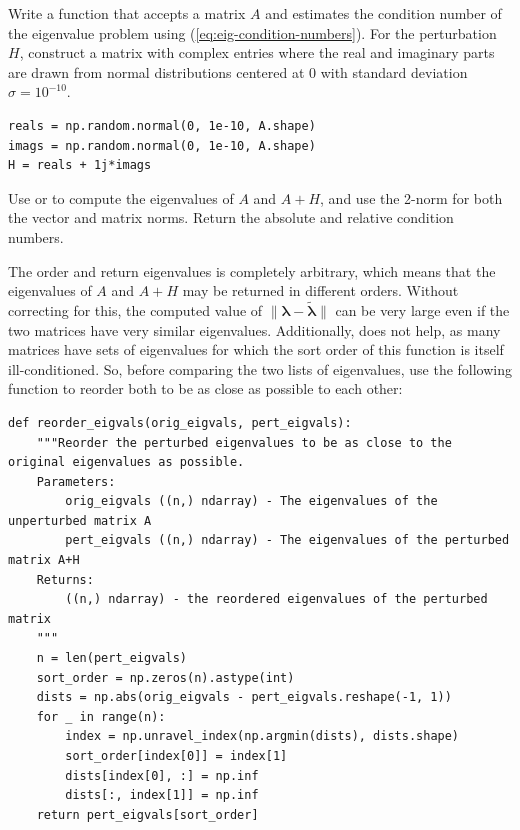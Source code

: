 \begin{problem}\label{prob:eigenvalue} %
Write a function that accepts a matrix $A$ and estimates the condition number of the eigenvalue problem using (\ref{eq:eig-condition-numbers}).
For the perturbation $H$, construct a matrix with complex entries where the real and imaginary parts are drawn from normal distributions centered at $0$ with standard deviation $\sigma = 10^{-10}$.
\begin{lstlisting}
reals = np.random.normal(0, 1e-10, A.shape)
imags = np.random.normal(0, 1e-10, A.shape)
H = reals + 1j*imags
\end{lstlisting}
Use  or  to compute the eigenvalues of $A$ and $A+H$, and use the 2-norm for both the vector and matrix norms.
Return the absolute and relative condition numbers.

The order  and  return eigenvalues is completely arbitrary, which means that the eigenvalues of $A$ and $A+H$ may be returned in different orders.
Without correcting for this, the computed value of $\|\boldsymbol{\lambda} - \tilde{\boldsymbol{\lambda}}\|$ can be very large even if the two matrices have very similar eigenvalues.
Additionally,  does not help, as many matrices have sets of eigenvalues for which the sort order of this function is itself ill-conditioned.
So, before comparing the two lists of eigenvalues, use the following function to reorder both to be as close as possible to each other:
\begin{lstlisting}
def reorder_eigvals(orig_eigvals, pert_eigvals):
    """Reorder the perturbed eigenvalues to be as close to the original eigenvalues as possible.
    Parameters:
        orig_eigvals ((n,) ndarray) - The eigenvalues of the unperturbed matrix A
        pert_eigvals ((n,) ndarray) - The eigenvalues of the perturbed matrix A+H
    Returns:
        ((n,) ndarray) - the reordered eigenvalues of the perturbed matrix
    """
    n = len(pert_eigvals)
    sort_order = np.zeros(n).astype(int)
    dists = np.abs(orig_eigvals - pert_eigvals.reshape(-1, 1))
    for _ in range(n):
        index = np.unravel_index(np.argmin(dists), dists.shape)
        sort_order[index[0]] = index[1]
        dists[index[0], :] = np.inf
        dists[:, index[1]] = np.inf
    return pert_eigvals[sort_order]
\end{lstlisting}
\label{prob:eig-condit}
\end{problem}

